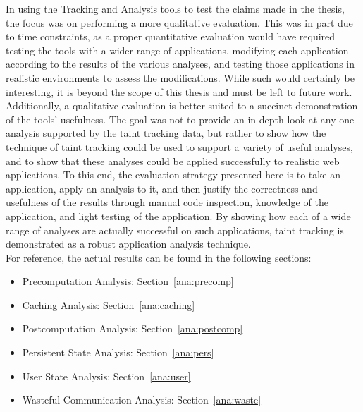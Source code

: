 \documentclass[msc,oneside]{ubcthesis}
\begin{document}
In using the Tracking and Analysis tools to test the claims made in the thesis, the focus was on performing a more qualitative evaluation. This was in part due to time constraints, as a proper quantitative evaluation would have required testing the tools with a wider range of applications, modifying each application according to the results of the various analyses, and testing those applications in realistic environments to assess the modifications. While such would certainly be interesting, it is beyond the scope of this thesis and must be left to future work. Additionally, a qualitative evaluation is better suited to a succinct demonstration of the tools' usefulness. The goal was not to provide an in-depth look at any one analysis supported by the taint tracking data, but rather to show how the technique of taint tracking could be used to support a variety of useful analyses, and to show that these analyses could be applied successfully to realistic web applications. To this end, the evaluation strategy presented here is to take an application, apply an analysis to it, and then justify the correctness and usefulness of the results through manual code inspection, knowledge of the application, and light testing of the application. By showing how each of a wide range of analyses are actually successful on such applications, taint tracking is demonstrated as a robust application analysis technique. \\

For reference, the actual results can be found in the following sections:
\begin{itemize}
\item Precomputation Analysis: Section~\ref{ana:precomp}
\item Caching Analysis: Section~\ref{ana:caching}
\item Postcomputation Analysis: Section~\ref{ana:postcomp}
\item Persistent State Analysis: Section~\ref{ana:pers}
\item User State Analysis: Section~\ref{ana:user}
\item Wasteful Communication Analysis: Section~\ref{ana:waste}
\end{itemize}

 
\end{document}

